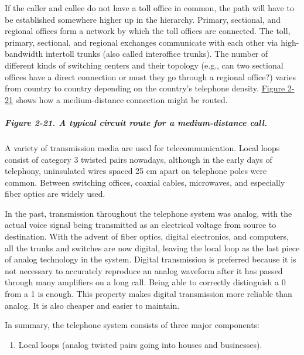 \documentclass[b5paper,11pt]{memoir}
\begin{document}
If the caller and callee do not have a toll office in common, the path
will have to be established somewhere higher up in the hierarchy.
Primary, sectional, and regional offices form a network by which the
toll offices are connected. The toll, primary, sectional, and regional
exchanges communicate with each other via high-bandwidth {intertoll
trunks} (also called {interoffice trunks}). The number of different
kinds of switching centers and their topology (e.g., can two sectional
offices have a direct connection or must they go through a regional
office?) varies from country to country depending on the country's
telephone density.
\protect\hyperlink{0130661023_ch02lev1sec5.htmlux5cux23ch02fig21}{Figure
2-21} shows how a medium-distance connection might be routed.

\subparagraph[Figure 2-21. A typical circuit route for a medium-distance
call.]{\texorpdfstring{\protect\hypertarget{0130661023_ch02lev1sec5.htmlux5cux23ch02fig21}{}{}Figure
2-21. A typical circuit route for a medium-distance
call.}{Figure 2-21. A typical circuit route for a medium-distance call.}}


A variety of transmission media are used for telecommunication. Local
loops consist of category 3 twisted pairs nowadays, although in the
early days of telephony, uninsulated wires spaced 25 cm apart on
telephone poles were common. Between switching offices, coaxial cables,
microwaves, and especially fiber optics are widely used.

In the past, transmission throughout the telephone system was analog,
with the actual voice signal being transmitted as an electrical voltage
from source to destination. With the advent of fiber optics, digital
electronics, and computers, all the trunks and switches are now digital,
leaving the local loop as the last piece of analog technology in the
system. Digital transmission is preferred because it is not necessary to
accurately reproduce an analog waveform after it has passed through many
amplifiers on a long call. Being able to correctly distinguish a 0 from
a 1 is enough. This property makes digital transmission more reliable
than analog. It is also cheaper and easier to maintain.

In summary, the telephone system consists of three major components:

{}

\begin{enumerate}
\def\labelenumi{\arabic{enumi}.}
\item
  {}

  Local loops (analog twisted pairs going into houses and businesses).
\end{enumerate}
\end{document}
